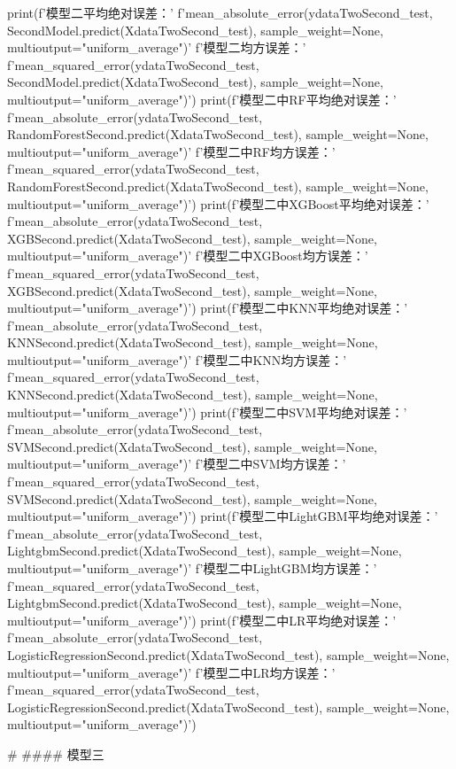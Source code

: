 \documentclass{MathorCupmodeling}
\begin{document}
\begin{python}
	
	print(f'模型二平均绝对误差：'
		  f'{mean_absolute_error(ydataTwoSecond_test, SecondModel.predict(XdataTwoSecond_test), sample_weight=None, multioutput="uniform_average")}\n'
		  f'模型二均方误差：'
		  f'{mean_squared_error(ydataTwoSecond_test, SecondModel.predict(XdataTwoSecond_test), sample_weight=None, multioutput="uniform_average")}')
	print(f'模型二中RF平均绝对误差：'
		  f'{mean_absolute_error(ydataTwoSecond_test, RandomForestSecond.predict(XdataTwoSecond_test), sample_weight=None, multioutput="uniform_average")}\n'
		  f'模型二中RF均方误差：'
		  f'{mean_squared_error(ydataTwoSecond_test, RandomForestSecond.predict(XdataTwoSecond_test), sample_weight=None, multioutput="uniform_average")}')
	print(f'模型二中XGBoost平均绝对误差：'
		  f'{mean_absolute_error(ydataTwoSecond_test, XGBSecond.predict(XdataTwoSecond_test), sample_weight=None, multioutput="uniform_average")}\n'
		  f'模型二中XGBoost均方误差：'
		  f'{mean_squared_error(ydataTwoSecond_test, XGBSecond.predict(XdataTwoSecond_test), sample_weight=None, multioutput="uniform_average")}')
	print(f'模型二中KNN平均绝对误差：'
		  f'{mean_absolute_error(ydataTwoSecond_test, KNNSecond.predict(XdataTwoSecond_test), sample_weight=None, multioutput="uniform_average")}\n'
		  f'模型二中KNN均方误差：'
		  f'{mean_squared_error(ydataTwoSecond_test, KNNSecond.predict(XdataTwoSecond_test), sample_weight=None, multioutput="uniform_average")}')
	print(f'模型二中SVM平均绝对误差：'
		  f'{mean_absolute_error(ydataTwoSecond_test, SVMSecond.predict(XdataTwoSecond_test), sample_weight=None, multioutput="uniform_average")}\n'
		  f'模型二中SVM均方误差：'
		  f'{mean_squared_error(ydataTwoSecond_test, SVMSecond.predict(XdataTwoSecond_test), sample_weight=None, multioutput="uniform_average")}')
	print(f'模型二中LightGBM平均绝对误差：'
		  f'{mean_absolute_error(ydataTwoSecond_test, LightgbmSecond.predict(XdataTwoSecond_test), sample_weight=None, multioutput="uniform_average")}\n'
		  f'模型二中LightGBM均方误差：'
		  f'{mean_squared_error(ydataTwoSecond_test, LightgbmSecond.predict(XdataTwoSecond_test), sample_weight=None, multioutput="uniform_average")}')
	print(f'模型二中LR平均绝对误差：'
		  f'{mean_absolute_error(ydataTwoSecond_test, LogisticRegressionSecond.predict(XdataTwoSecond_test), sample_weight=None, multioutput="uniform_average")}\n'
		  f'模型二中LR均方误差：'
		  f'{mean_squared_error(ydataTwoSecond_test, LogisticRegressionSecond.predict(XdataTwoSecond_test), sample_weight=None, multioutput="uniform_average")}')
	
	# #### 模型三
	

\end{python}
\end{document}
